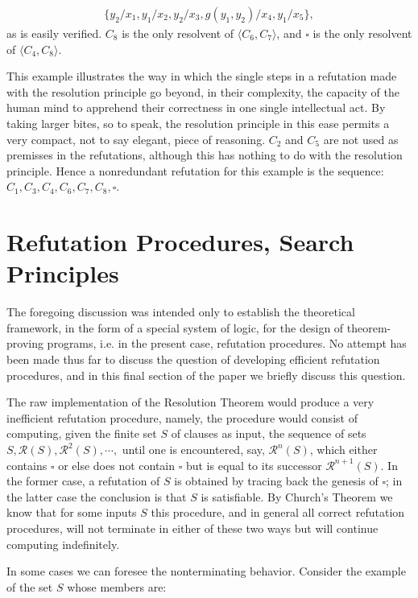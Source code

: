 \documentclass[8pt]{extarticle}
\begin{document}
\begin{align*}
    \{y_2/x_1, y_1/x_2, y_2/x_3, g(y_1, y_2)/x_4, y_1/x_5\},
\end{align*}
\noindent
as is easily verified. $C_8$ is the only resolvent of $\langle C_6, C_7\rangle$, and $\square$ is the only resolvent of $\langle C_4, C_8\rangle$.

This example illustrates the way in which the single steps in a refutation made with the resolution principle go beyond, in their complexity, the capacity of the human mind to apprehend their correctness in one single intellectual act. By taking larger bites, so to speak, the resolution principle in this ease permits a very compact, not to say elegant, piece of reasoning. $C_2$ and $C_5$ are not used as premisses in the refutations, although this has nothing to do with the resolution principle. Hence a nonredundant refutation for this example is the sequence: $C_1, C_3, C_4, C_6, C_7, C_8, \square$.

\section{Refutation Procedures, Search Principles}

The foregoing discussion was intended only to establish the theoretical framework, in the form of a special system of logic, for the design of theorem-proving programs, i.e. in the present case, refutation procedures. No attempt has been made thus far to discuss the question of developing efficient refutation procedures, and in this final section of the paper we briefly discuss this question. 

The raw implementation of the Resolution Theorem would produce a very 
inefficient refutation procedure, namely, the procedure would consist of computing, given the finite set $S$ of clauses as input, the sequence of sets $S, \mathcal{R}(S), \mathcal{R}^2(S),\dotsm,$ until one is encountered, say, $\mathcal{R}^n(S)$, which either contains $\square$ or else does not contain $\square$ but is equal to its successor $\mathcal{R}^{n+1}(S)$. In the former case, a refutation of $S$ is obtained by tracing back the genesis of $\square$; in the latter case the conclusion is that $S$ is satisfiable. By Church's Theorem \cite{church_1936} we know that for some inputs $S$ this procedure, and in general all correct refutation procedures, will not terminate in either of these two ways but will continue computing indefinitely. 

In some cases we can foresee the nonterminating behavior. Consider the example of the set $S$ whose members are:
\end{document}
